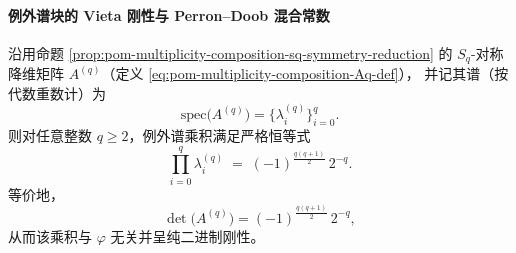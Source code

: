 %
%

\paragraph{例外谱块的 Vieta 刚性与 Perron--Doob 混合常数}

\begin{theorem}[例外谱乘积的完全闭式与三角数符号律]\label{thm:pom-replica-softcore-exceptional-spectrum-product}
沿用命题 \ref{prop:pom-multiplicity-composition-sq-symmetry-reduction} 的
\(S_q\)-对称降维矩阵 \(A^{(q)}\)（定义 \eqref{eq:pom-multiplicity-composition-Aq-def}），
并记其谱（按代数重数计）为
\[
\mathrm{spec}\!\bigl(A^{(q)}\bigr)=\{\lambda_i^{(q)}\}_{i=0}^{q}.
\]
则对任意整数 \(q\ge 2\)，例外谱乘积满足严格恒等式
\begin{equation}\label{eq:pom-replica-softcore-exceptional-product}
\boxed{\;
\prod_{i=0}^{q}\lambda_i^{(q)}
\;=\;
(-1)^{\frac{q(q+1)}{2}}\,2^{-q}. \;}
\end{equation}
等价地，
\[
\det\!\bigl(A^{(q)}\bigr)=(-1)^{\frac{q(q+1)}{2}}\,2^{-q},
\]
从而该乘积与 \(\varphi\) 无关并呈纯二进制刚性。
\end{theorem}
